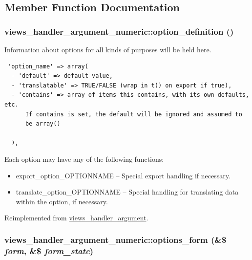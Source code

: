 \subsection{Member Function Documentation}
\hypertarget{classviews__handler__argument__numeric_d2b7dc4afcf4d444e18752cfbd23ec63}{
\subsubsection[{option\_\-definition}]{\setlength{\rightskip}{0pt plus 5cm}views\_\-handler\_\-argument\_\-numeric::option\_\-definition ()}}
\label{classviews__handler__argument__numeric_d2b7dc4afcf4d444e18752cfbd23ec63}


Information about options for all kinds of purposes will be held here. 

\begin{Code}\begin{verbatim} 'option_name' => array(
  - 'default' => default value,
  - 'translatable' => TRUE/FALSE (wrap in t() on export if true),
  - 'contains' => array of items this contains, with its own defaults, etc.
      If contains is set, the default will be ignored and assumed to
      be array()

  ),
\end{verbatim}
\end{Code}

 Each option may have any of the following functions:\begin{itemize}
\item export\_\-option\_\-OPTIONNAME -- Special export handling if necessary.\item translate\_\-option\_\-OPTIONNAME -- Special handling for translating data within the option, if necessary. \end{itemize}


Reimplemented from \hyperlink{classviews__handler__argument_117ab20a53624e082e6e32a22d4521cc}{views\_\-handler\_\-argument}.\hypertarget{classviews__handler__argument__numeric_b30359963ec4962258bb8db3b6a870c4}{
\subsubsection[{options\_\-form}]{\setlength{\rightskip}{0pt plus 5cm}views\_\-handler\_\-argument\_\-numeric::options\_\-form (\&\$ {\em form}, \/  \&\$ {\em form\_\-state})}}
\label{classviews__handler__argument__numeric_b30359963ec4962258bb8db3b6a870c4}


